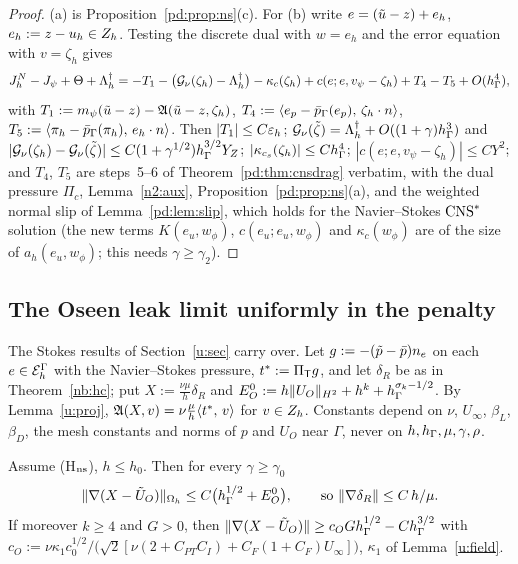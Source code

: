 \begin{proof}
(a) is Proposition~\ref{pd:prop:ns}(c). For (b) write $e=(\tilde u-z)+e_h$, $e_h:=z-u_h\in Z_h$. Testing the discrete dual with $w=e_h$ and the error equation with $v=\zeta_h$ gives
\[
J^N_h-J_\psi+\Theta+\Lambda^\dagger_h=-T_1-\bigl(\mathcal G_\nu(\zeta_h)-\Lambda^\dagger_h\bigr)-\kappa_c(\zeta_h)+c(e;e,v_\psi-\zeta_h)+T_4-T_5+O(h_\Gamma^4),
\]
with $T_1:=m_\psi(\tilde u-z)-\mathfrak A(\tilde u-z,\zeta_h)$, $T_4:=\langle e_p-\bar p_{\Gamma}(e_p),\, \zeta_h\cdot n\rangle$, $T_5:=\langle \pi_h-\bar p_{\Gamma}(\pi_h),\, e_h\cdot n\rangle$. Then $|T_1|\le C\varepsilon_h$; $\mathcal G_\nu(\tilde\zeta)=\Lambda^\dagger_h+O((1+\gamma)h_\Gamma^3)$ and $|\mathcal G_\nu(\zeta_h)-\mathcal G_\nu(\tilde\zeta)|\le C(1+\gamma^{1/2})h_\Gamma^{3/2}Y_Z$; $|\kappa_{c_s}(\zeta_h)|\le Ch_\Gamma^4$; $|c(e;e,v_\psi-\zeta_h)|\le CY^2$; and $T_4$, $T_5$ are steps~5--6 of Theorem~\ref{pd:thm:cnsdrag} verbatim, with the dual pressure $\Pi_c$, Lemma~\ref{n2:aux}, Proposition~\ref{pd:prop:ns}(a), and the weighted normal slip of Lemma~\ref{pd:lem:slip}, which holds for the Navier--Stokes $\mathrm{CNS}^\ast$ solution (the new terms $K(e_u,w_\phi)$, $c(e_u;e_u,w_\phi)$ and $\kappa_c(w_\phi)$ are of the size of $a_h(e_u,w_\phi)$; this needs $\gamma\ge\gamma_2$).
\end{proof}

\subsection{The Oseen leak limit uniformly in the penalty}\label{n2:unif}

The Stokes results of Section~\ref{u:sec} carry over. Let $g:=-(\tilde p-\bar p)n_e$ on each $e\in\mathcal E_h^\Gamma$ with the Navier--Stokes pressure, $t^\ast:=\Pi_{\mathsf T} g$, and let $\delta_R$ be as in Theorem~\ref{nb:hc}; put $X:=\frac{\nu\mu}h\delta_R$ and $E^0_O:=h\lVert U_O\rVert_{H^2}+h^k+h_\Gamma^{\sigma_k-1/2}$. By Lemma~\ref{u:proj}, $\mathfrak A(X,v)=\nu\frac\mu h\langle t^\ast,\, v\rangle$ for $v\in Z_h$. Constants depend on $\nu$, $U_\infty$, $\beta_L$, $\beta_D$, the mesh constants and norms of $p$ and $U_O$ near $\Gamma$, never on $h,h_\Gamma,\mu,\gamma,\rho$.

\begin{theorem}\label{n2:up}
Assume (H$_{\rm ns}$), $h\le h_0$. Then for every $\gamma\ge\gamma_0$
\[
\lVert \nabla(X-\tilde U_O)\rVert_{\Omega_h}\le C\bigl(h_\Gamma^{1/2}+E^0_O\bigr),\qquad\text{so }\lVert \nabla\delta_R\rVert\le C\,h/\mu .
\]
If moreover $k\ge4$ and $G>0$, then $\lVert \nabla(X-\tilde U_O)\rVert\ge c_OGh_\Gamma^{1/2}-Ch_\Gamma^{3/2}$ with
$c_O:=\nu\kappa_1c_0^{1/2}/\bigl(\sqrt2[\nu(2+C_{PT}C_I)+C_F(1+C_F)U_\infty]\bigr)$, $\kappa_1$ of Lemma~\ref{u:field}.
\end{theorem}

